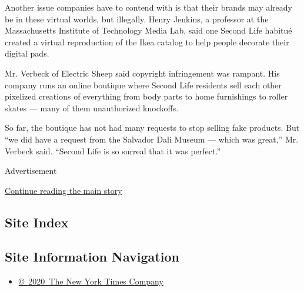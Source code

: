 Another issue companies have to contend with is that their brands may
already be in these virtual worlds, but illegally. Henry Jenkins, a
professor at the Massachusetts Institute of Technology Media Lab, said
one Second Life habitué created a virtual reproduction of the Ikea
catalog to help people decorate their digital pads.

Mr. Verbeck of Electric Sheep said copyright infringement was rampant.
His company runs an online boutique where Second Life residents sell
each other pixelized creations of everything from body parts to home
furnishings to roller skates --- many of them unauthorized knockoffs.

So far, the boutique has not had many requests to stop selling fake
products. But ``we did have a request from the Salvador Dali Museum ---
which was great,'' Mr. Verbeck said. ``Second Life is so surreal that it
was perfect.''

Advertisement

\protect\hyperlink{after-bottom}{Continue reading the main story}

\hypertarget{site-index}{%
\subsection{Site Index}\label{site-index}}

\hypertarget{site-information-navigation}{%
\subsection{Site Information
Navigation}\label{site-information-navigation}}

\begin{itemize}
\tightlist
\item
  \href{https://help.nytimes3xbfgragh.onion/hc/en-us/articles/115014792127-Copyright-notice}{©~2020~The
  New York Times Company}
\end{itemize}

